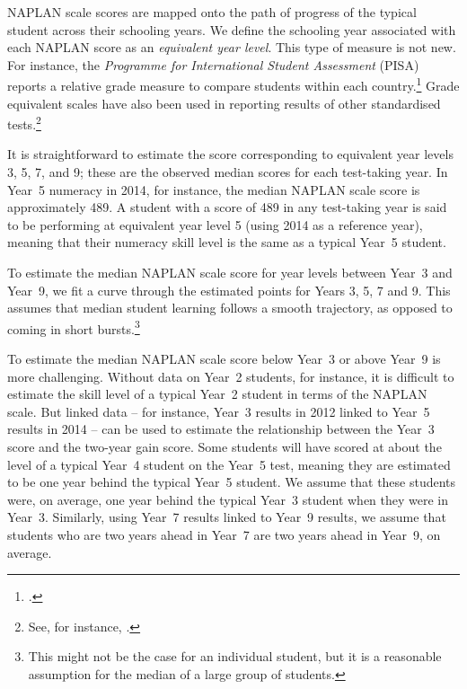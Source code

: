 NAPLAN scale scores are mapped onto the path of progress of the typical student across their schooling years. We define the schooling year associated with each NAPLAN score as an \textit{equivalent year level}. This type of measure is not new. For instance, the \textit{Programme for International Student Assessment} (PISA) reports a relative grade measure to compare students within each country.\footcite{oecd2013} Grade equivalent scales have also been used in reporting results of other standardised tests.\footnote{See, for instance, \textcite{renaissance2015}.}

It is straightforward to estimate the score corresponding to equivalent year levels 3, 5, 7, and 9; these are the observed median scores for each test-taking year. In \mbox{Year 5} numeracy in 2014, for instance, the median NAPLAN scale score is approximately 489. A student with a score of 489 in any test-taking year is said to be performing at equivalent year level 5 (using 2014 as a reference year), meaning that their numeracy skill level is the same as a typical \mbox{Year 5} student.

To estimate the median NAPLAN scale score for year levels between \mbox{Year 3} and \mbox{Year 9}, we fit a curve through the estimated points for Years 3, 5, 7 and 9. This assumes that median student learning follows a smooth trajectory, as opposed to coming in short bursts.\footnote{This might not be the case for an individual student, but it is a reasonable assumption for the median of a large group of students.}

\newpage
To estimate the median NAPLAN scale score below \mbox{Year 3} or above \mbox{Year 9} is more challenging. Without data on \mbox{Year 2} students, for instance, it is difficult to estimate the skill level of a typical \mbox{Year 2} student in terms of the NAPLAN scale. But linked data -- for instance, \mbox{Year 3} results in 2012 linked to \mbox{Year 5} results in 2014 -- can be used to estimate the relationship between the \mbox{Year 3} score and the two-year gain score. Some students will have scored at about the level of a typical \mbox{Year 4} student on the \mbox{Year 5} test, meaning they are estimated to be one year behind the typical \mbox{Year 5} student. We assume that these students were, on average, one year behind the typical \mbox{Year 3} student when they were in \mbox{Year 3}. Similarly, using \mbox{Year 7} results linked to \mbox{Year 9} results, we assume that students who are two years ahead in \mbox{Year 7} are two years ahead in \mbox{Year 9}, on average. 

